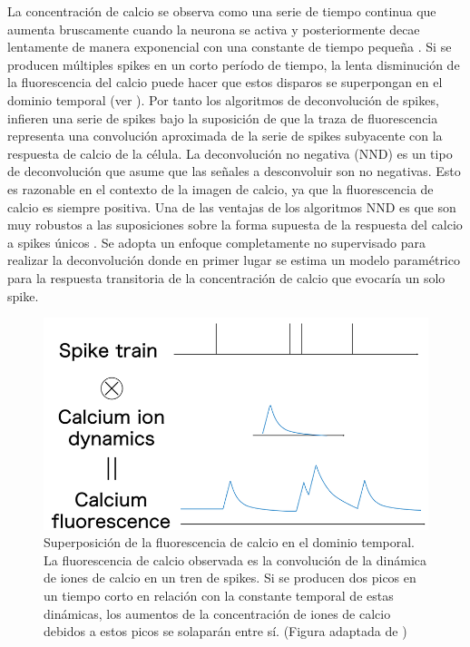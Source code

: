 La concentración de calcio se observa como una serie de tiempo continua que aumenta bruscamente cuando la neurona se activa y posteriormente decae lentamente de manera exponencial con una constante de tiempo pequeña \cite{shibue_deconvolution_2020}. Si se producen múltiples spikes en un corto período de tiempo, la lenta disminución de la fluorescencia del calcio puede hacer que estos disparos se superpongan en el dominio temporal (ver ). Por  tanto los  algoritmos de deconvolución de spikes,  infieren una serie de spikes bajo la suposición de que la traza de fluorescencia representa una convolución aproximada de la serie de spikes subyacente con la respuesta de calcio de la célula. La deconvolución no negativa (NND) es un tipo de deconvolución que asume que las señales a desconvoluir son no negativas. Esto es razonable en el contexto de la imagen de calcio, ya que la fluorescencia de calcio es siempre positiva.  Una de las ventajas de los algoritmos NND es que son  muy robustos a las suposiciones sobre la forma supuesta de la respuesta del calcio a spikes únicos \cite{pachitariu_robustness_2018}. Se adopta  un enfoque completamente no supervisado para realizar la deconvolución donde en primer lugar se estima  un modelo paramétrico para la respuesta transitoria de la concentración de calcio que evocaría un solo spike.

 \begin{figure}[h!]
	\centering\includegraphics[width=\imsize]{dinamicacalcio.png}
	\caption[Superposición de la fluorescencia de calcio en el dominio temporal.]{Superposición de la fluorescencia de calcio en el dominio temporal. La fluorescencia de calcio observada  es la convolución de la dinámica de iones de calcio en un tren de spikes.  Si se producen dos picos en un tiempo corto en relación con la constante temporal de estas dinámicas, los aumentos de la concentración de iones de calcio debidos a estos picos se solaparán entre sí. (Figura adaptada de \protect\cite{shibue_deconvolution_2020})}\label{fig:dinamicacalcio}
\end{figure}




